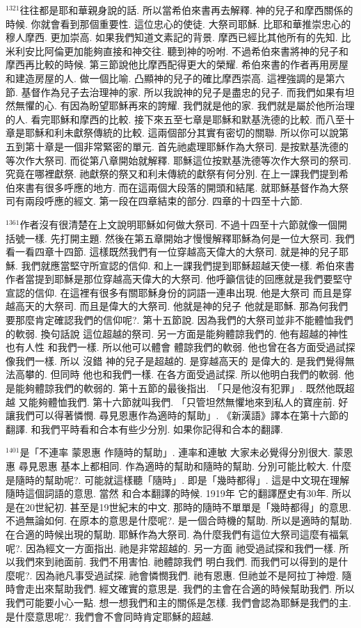 \documentclass{book}
\begin{document}
$^{1321}$往往都是耶和華親身說的話.
所以當希伯來書再去解釋.
神的兒子和摩西關係的時候.
你就會看到那個重要性.
這位忠心的使徒.
大祭司耶穌.
比耶和華推崇忠心的穆人摩西.
更加崇高.
如果我們知道文素記的背景.
摩西已經比其他所有的先知.
比米利安比阿倫更加能夠直接和神交往.
聽到神的吩咐.
不過希伯來書將神的兒子和摩西再比較的時候.
第三節說他比摩西配得更大的榮耀.
希伯來書的作者再用房屋和建造房屋的人.
做一個比喻.
凸顯神的兒子的確比摩西崇高.
這裡強調的是第六節.
基督作為兒子去治理神的家.
所以我說神的兒子是盡忠的兒子.
而我們如果有坦然無懼的心.
有因為盼望耶穌再來的誇耀.
我們就是他的家.
我們就是屬於他所治理的人.
看完耶穌和摩西的比較.
接下來五至七章是耶穌和默基洗德的比較.
而八至十章是耶穌和利未獻祭傳統的比較.
這兩個部分其實有密切的關聯.
所以你可以說第五到第十章是一個非常緊密的單元.
首先祂處理耶穌作為大祭司.
是按默基洗德的等次作大祭司.
而從第八章開始就解釋.
耶穌這位按默基洗德等次作大祭司的祭司.
究竟在哪裡獻祭.
祂獻祭的祭又和利未傳統的獻祭有何分別.
在上一課我們提到希伯來書有很多呼應的地方.
而在這兩個大段落的開頭和結尾.
就耶穌基督作為大祭司有兩段呼應的經文.
第一段在四章結束的部分.
四章的十四至十六節.

$^{1361}$作者沒有很清楚在上文說明耶穌如何做大祭司.
不過十四至十六節就像一個開括號一樣.
先打開主題.
然後在第五章開始才慢慢解釋耶穌為何是一位大祭司.
我們看一看四章十四節.
這樣既然我們有一位穿越高天偉大的大祭司.
就是神的兒子耶穌.
我們就應當堅守所宣認的信仰.
和上一課我們提到耶穌超越天使一樣.
希伯來書作者當提到耶穌是那位穿越高天偉大的大祭司.
他呼籲信徒的回應就是我們要堅守宣認的信仰.
在這裡有很多有關耶穌身份的詞語一連串出現.
他是大祭司 而且是穿越高天的大祭司.
而且是偉大的大祭司.
他就是神的兒子 他就是耶穌.
那為何我們要那麼肯定確認我們的信仰呢?.
第十五節說.
因為我們的大祭司並非不能體恤我們的軟弱.
換句話說 這位超越的祭司.
另一方面是能夠體諒我們的.
他有超越的神性 也有人性 和我們一樣.
所以他可以體會 體諒我們的軟弱.
他也曾在各方面受過試探 像我們一樣.
所以 沒錯 神的兒子是超越的.
是穿越高天的 是偉大的.
是我們覺得無法高攀的.
但同時 他也和我們一樣.
在各方面受過試探.
所以他明白我們的軟弱.
他是能夠體諒我們的軟弱的.
第十五節的最後指出.
「只是他沒有犯罪」.
既然他既超越 又能夠體恤我們.
第十六節就叫我們.
「只管坦然無懼地來到私人的寶座前.
好讓我們可以得著憐憫.
尋見恩惠作為適時的幫助」.
《新漢語》譯本在第十六節的翻譯.
和我們平時看和合本有些少分別.
如果你記得和合本的翻譯.

$^{1401}$是「不連率 蒙恩惠 作隨時的幫助」.
連率和連敏 大家未必覺得分別很大.
蒙恩惠 尋見恩惠 基本上都相同.
作為適時的幫助和隨時的幫助.
分別可能比較大.
什麼是隨時的幫助呢?.
可能就這樣聽「隨時」.
即是「幾時都得」.
這是中文現在理解隨時這個詞語的意思.
當然 和合本翻譯的時候.
1919年 它的翻譯歷史有30年.
所以是在20世紀初.
甚至是19世紀末的中文.
那時的隨時不單單是「幾時都得」的意思.
不過無論如何.
在原本的意思是什麼呢?.
是一個合時機的幫助.
所以是適時的幫助.
在合適的時候出現的幫助.
耶穌作為大祭司.
為什麼我們有這位大祭司這麼有福氣呢?.
因為經文一方面指出.
祂是非常超越的.
另一方面 祂受過試探和我們一樣.
所以我們來到祂面前.
我們不用害怕.
祂體諒我們 明白我們.
而我們可以得到的是什麼呢?.
因為祂凡事受過試探.
祂會憐憫我們.
祂有恩惠.
但祂並不是阿拉丁神燈.
隨時會走出來幫助我們.
經文確實的意思是.
我們的主會在合適的時候幫助我們.
所以我們可能要小心一點.
想一想我們和主的關係是怎樣.
我們會認為耶穌是我們的主.
是什麼意思呢?.
我們會不會同時肯定耶穌的超越.
\end{document}
